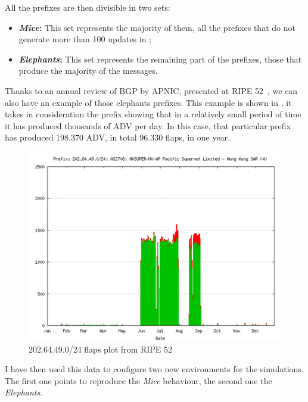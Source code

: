 All the prefixes are then divisible in two sets:
\begin{itemize}
	\item \textbf{\textit{Mice}:} This set represents the majority of them,
		all the prefixes that do not generate more than \num{100} updates
		in ;
	\item \textbf{\textit{Elephants}:} This set represents the remaining part
		of the prefixes, those that produce the majority of the messages.
\end{itemize}

Thanks to an annual review of \ac{BGP} by \ac{APNIC}, presented at \ac{RIPE}
\num{52}~\cite{huston2006bgp},
we can also have an example of those elephants prefixes.
This example is shown in , it takes in consideration the
prefix  showing that in a relatively small period of time it has
produced thousands of \ac{ADV} per day.
In this case, that particular prefix has produced \num{198,370} \ac{ADV},
in total \num{96,330} flaps, in one year.

\begin{figure}[h]
    \centering
    \includegraphics[scale=0.22]{images/RFD/miceVSelephants/ripePrefixFlap.png}
		\caption{202.64.49.0/24 flaps plot from \ac{RIPE} 52~\cite{huston2006bgp}}
    \label{fig:ripePrefixFlaps}
\end{figure}

I have then used this data to configure two new environments for the simulations.
The first one points to reproduce the \textit{Mice} behaviour, the second
one the \textit{Elephants}.

